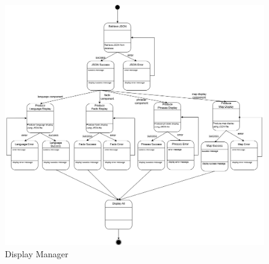 \begin{figure}[H]
	\centering
	\includegraphics[width=\linewidth]{Section2/display_manager_state_diagram.png}
	\caption{Display Manager}
	\label{DisplayManager}
\end{figure}